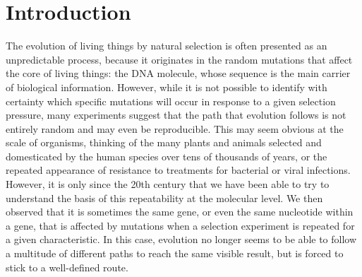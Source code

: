 \chapter{Introduction}
\label{chap:intro}

The evolution of living things by natural selection is often presented as an unpredictable process, because it originates in the random mutations that affect the core of living things: the DNA molecule, whose sequence is the main carrier of biological information.
However, while it is not possible to identify with certainty which specific mutations will occur in response to a given selection pressure, many experiments suggest that the path that evolution follows is not entirely random and may even be reproducible.
This may seem obvious at the scale of organisms, thinking of the many plants and animals selected and domesticated by the human species over tens of thousands of years, or the repeated appearance of resistance to treatments for bacterial or viral infections.
However, it is only since the 20th century that we have been able to try to understand the basis of this repeatability at the molecular level.
We then observed that it is sometimes the same gene, or even the same nucleotide within a gene, that is affected by mutations when a selection experiment is repeated for a given characteristic.
In this case, evolution no longer seems to be able to follow a multitude of different paths to reach the same visible result, but is forced to stick to a well-defined route.

